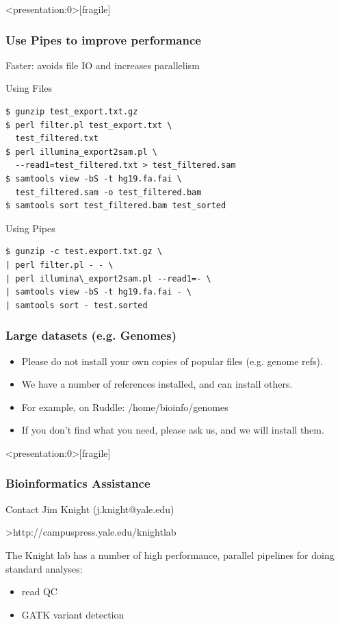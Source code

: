\documentclass[10pt]{beamer}
\begin{document}
\begin{frame}<presentation:0>[fragile]
\frametitle{Use Pipes to improve performance}

\vskip10pt
Faster: avoids file IO and increases parallelism

\vskip10pt
Using Files
\begin{verbatim}
$ gunzip test_export.txt.gz 
$ perl filter.pl test_export.txt \
  test_filtered.txt
$ perl illumina_export2sam.pl \
  --read1=test_filtered.txt > test_filtered.sam
$ samtools view -bS -t hg19.fa.fai \
  test_filtered.sam -o test_filtered.bam
$ samtools sort test_filtered.bam test_sorted
\end{verbatim}

Using Pipes
\begin{verbatim}
$ gunzip -c test.export.txt.gz \
| perl filter.pl - - \
| perl illumina\_export2sam.pl --read1=- \
| samtools view -bS -t hg19.fa.fai - \
| samtools sort - test.sorted
\end{verbatim}
\end{frame}

\begin{frame}[fragile]
\frametitle{Large datasets (e.g. Genomes)}

\begin{itemize}
\item Please do not install your own copies of popular files (e.g. genome refs).  
\item We have a number of references installed, and can install others.
\item For example, on Ruddle: /home/bioinfo/genomes
\item If you don't find what you need, please ask us, and we will install them.
\end{itemize}
\end{frame}

\begin{frame}<presentation:0>[fragile]
\frametitle{Bioinformatics Assistance}

Contact Jim Knight (j.knight@yale.edu)

>http://campuspress.yale.edu/knightlab

The Knight lab has a number of high performance, parallel pipelines for
doing standard analyses:

\begin{itemize}
\item read QC
\item GATK variant detection
\end{itemize}
\end{frame}
\end{document}
